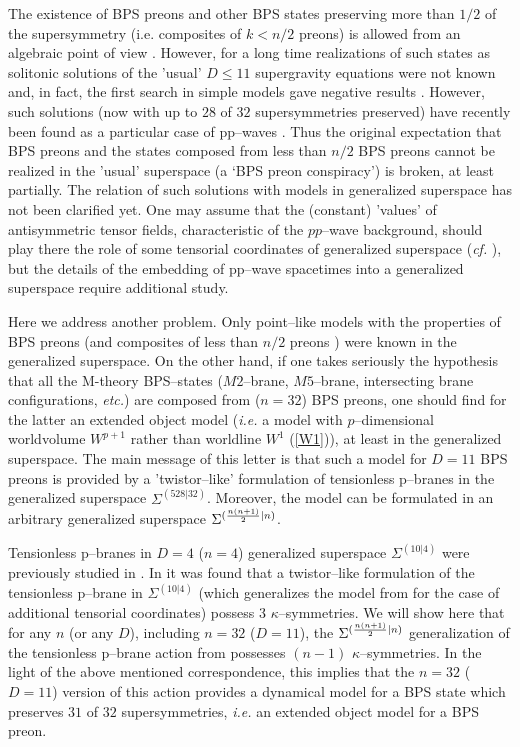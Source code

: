 \documentclass[a4paper,11pt]{article}
\begin{document}
The existence of BPS preons and  other BPS states preserving more than 
$1/2$ of the supersymmetry (i.e. composites of  
$k< n/2$ preons) 
is allowed from an algebraic point of view 
\cite{BL98,Hull99,GGHT00}. However, for a long time  realizations 
of such states as solitonic solutions of the 'usual' $D\leq 11$ supergravity 
equations were not known and, in fact, 
the first search in simple models gave negative results \cite{GGHT00}. 
However, 
such solutions (now with up to $28$ of $32$ supersymmetries 
preserved) have recently been found 
\cite{CLP02,GH02,BJM02} as a particular case of 
pp--waves \cite{PP}. Thus the original 
expectation that BPS preons and the states composed from 
less than $n/2$ BPS preons cannot be realized in the 'usual' superspace  
(a `BPS preon conspiracy')  is  broken, at least partially.  
The relation of such solutions with models in generalized superspace 
has not been clarified yet. One may assume that  
the (constant) 'values' of antisymmetric tensor fields, characteristic
of the $pp$--wave background, should play there the role of 
some tensorial coordinates of generalized superspace 
({\it cf.} \cite{JdA00}), but the details of the 
embedding of pp--wave spacetimes into a generalized superspace require 
additional study. 

Here we address another problem. 
Only point--like models 
with the properties of BPS preons \cite{BL98} (and composites of less than 
$n/2$ preons \cite{BL98'}) were known in the  generalized superspace. 
On the other hand, if one takes seriously the hypothesis 
\cite{BPS01} that all the M-theory BPS--states ($M2$--brane, 
$M5$--brane, intersecting brane configurations, {\it etc.}) are composed 
from ($n=32$) BPS preons, 
one should find for the latter an extended object  
model ({\it i.e.} a model with $p$--dimensional worldvolume 
$W^{p+1}$ rather than worldline $W^1$ (\ref{W1})), at least in 
the generalized superspace. 
The main message of this letter is that such a model for 
$D=11$ BPS preons is provided by a 'twistor--like' formulation of 
tensionless p--branes in the generalized superspace $\Sigma^{(528|32)}$. 
Moreover, the model can be formulated in an arbitrary generalized superspace 
 $\Sigma^{({n(n+1)\over 2}|n)}$. 



Tensionless p--branes in $D=4$ ($n=4$) generalized superspace 
 $\Sigma^{(10|4)}$ were previously  
studied in \cite{ZL,ZU}. In \cite{ZU} it was found that a  
twistor--like formulation of the tensionless p--brane   
in $\Sigma^{(10|4)}$ (which generalizes the model from \cite{BZ} 
for the case of additional tensorial coordinates) 
possess 3 $\kappa$--symmetries. 
We will show here that for any $n$ (or any $D$), including $n=32$ ($D=11$), 
the $\Sigma^{({n(n+1)\over 2}|n)}$ generalization of the tensionless p--brane 
action from \cite{BZ} possesses $(n-1)$ $\kappa$--symmetries. 
In the light of the above mentioned correspondence, this implies that  
the $n= 32$ ($D=11$) version of this action 
provides a dynamical model for a BPS state which preserves  
$31$ of $32$ supersymmetries, {\it i.e.} an extended object model for 
a BPS preon. 
\end{document}
